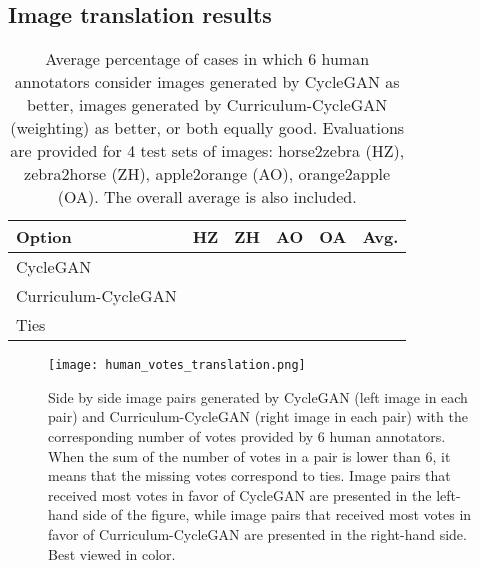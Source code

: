 \documentclass[10pt,twocolumn,letterpaper]{article}
\begin{document}
\vspace{-0.1cm}
\subsection{Image translation results}
\vspace{-0.1cm}

\begin{table}[t]
\setlength\tabcolsep{2.0pt}
\small{
\begin{center}
\begin{tabular}{|l|c|c|c|c|c|}
\hline
Option & HZ & ZH & AO & OA  & Avg. \\
\hline
\hline
CycleGAN~\cite{Zhu-ICCV-2017}  &  &  &  &  & \\
\hline
Curriculum-CycleGAN     &  &  &  &  & \\
\hline
Ties                    &  &  &  &  & \\
\hline
\end{tabular}
\end{center}
\vspace*{-0.15cm}
\caption{Average percentage of cases in which 6 human annotators consider images generated by CycleGAN as better, images generated by Curriculum-CycleGAN (weighting) as better, or both equally good. Evaluations are provided for 4 test sets of images: horse2zebra (HZ), zebra2horse (ZH), apple2orange (AO), orange2apple (OA). The overall average is also included.\label{tab_results}}
}
\vspace*{-0.4cm}
\end{table}

\begin{figure*}[!t]
\begin{center}
\texttt{[image: human\_votes\_translation.png]}
\end{center}
\vspace*{-0.45cm}
\caption{Side by side image pairs generated by CycleGAN (left image in each pair) and Curriculum-CycleGAN (right image in each pair) with the corresponding number of votes provided by 6 human annotators. When the sum of the number of votes in a pair is lower than 6, it means that the missing votes correspond to ties. Image pairs that received most votes in favor of CycleGAN are presented in the left-hand side of the figure, while image pairs that received most votes in favor of Curriculum-CycleGAN are presented in the right-hand side. Best viewed in color.}
\label{fig_translation_voted}
\vspace*{-0.3cm}
\end{figure*}
\end{document}
